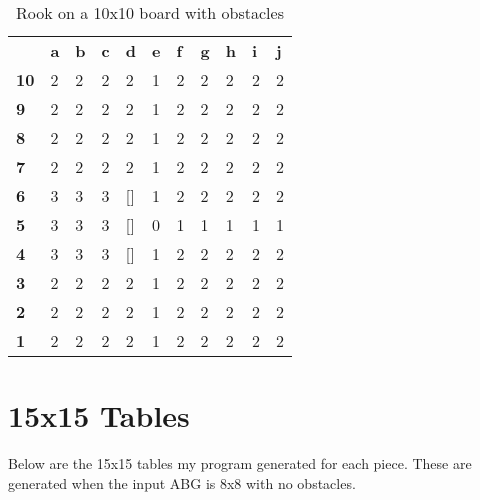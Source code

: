 \documentclass{article}
\begin{document}
\begin{table}[H]
\centering
\caption{Rook on a 10x10 board with obstacles}
\label{my-label}
\begin{tabular}{lllllllllll}
                                 & \textbf{a} & \textbf{b} & \textbf{c} & \textbf{d} & \textbf{e} & \textbf{f} & \textbf{g} & \textbf{h} & \textbf{i} & \textbf{j} \\ \cline{2-11} 
\multicolumn{1}{l|}{\textbf{10}} & 2          & 2          & 2          & 2          & 1          & 2          & 2          & 2          & 2          & 2          \\
\multicolumn{1}{l|}{\textbf{9}}  & 2          & 2          & 2          & 2          & 1          & 2          & 2          & 2          & 2          & 2          \\
\multicolumn{1}{l|}{\textbf{8}}  & 2          & 2          & 2          & 2          & 1          & 2          & 2          & 2          & 2          & 2          \\
\multicolumn{1}{l|}{\textbf{7}}  & 2          & 2          & 2          & 2          & 1          & 2          & 2          & 2          & 2          & 2          \\
\multicolumn{1}{l|}{\textbf{6}}  & 3          & 3          & 3          & {[}{]}     & 1          & 2          & 2          & 2          & 2          & 2          \\
\multicolumn{1}{l|}{\textbf{5}}  & 3          & 3          & 3          & {[}{]}     & 0          & 1          & 1          & 1          & 1          & 1          \\
\multicolumn{1}{l|}{\textbf{4}}  & 3          & 3          & 3          & {[}{]}     & 1          & 2          & 2          & 2          & 2          & 2          \\
\multicolumn{1}{l|}{\textbf{3}}  & 2          & 2          & 2          & 2          & 1          & 2          & 2          & 2          & 2          & 2          \\
\multicolumn{1}{l|}{\textbf{2}}  & 2          & 2          & 2          & 2          & 1          & 2          & 2          & 2          & 2          & 2          \\
\multicolumn{1}{l|}{\textbf{1}}  & 2          & 2          & 2          & 2          & 1          & 2          & 2          & 2          & 2          & 2         
\end{tabular}
\end{table}


\section*{15x15 Tables}
Below are the 15x15 tables my program generated for each piece. These are generated when the input ABG is 8x8 with no obstacles.
\end{document}
